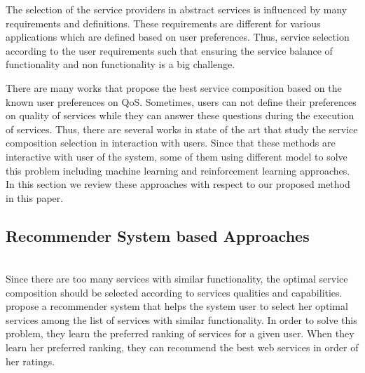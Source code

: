 \documentclass[10pt,journal,compsoc]{IEEEtran}
\begin{document}
The selection of the service providers in abstract services is influenced by many requirements and definitions. These requirements are different for various applications which are defined based on user preferences. Thus, service selection according to the user requirements such that ensuring the service balance of functionality and non functionality is a big challenge. 


There are many works that propose the best service composition based on the known user preferences on QoS. Sometimes, users can not define their preferences on quality of services while they can answer these questions during the execution of services. Thus, there are several works in state of the art that study the service composition selection in interaction with users. Since that these methods are interactive with user of the system, some of them using different model to solve this problem including machine learning and reinforcement learning approaches. In this section we review these approaches with respect to our proposed method in this paper. 

\subsection{Recommender System based Approaches}
\cite{Manikrao2005}  \\
Since there are too many services with similar functionality, the optimal service composition should be selected according to services qualities and capabilities. \cite{Manikrao2005} propose a recommender system that helps the system user to select her optimal services among the list of services with similar functionality. In order to solve this problem, they learn the preferred ranking of services for a given user. When they learn her preferred ranking, they can recommend the best web services in order of her ratings. 

%
\end{document}
